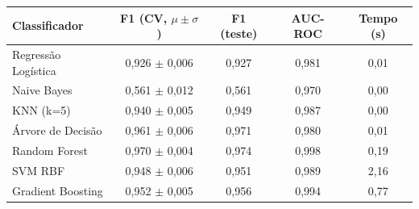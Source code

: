 \begin{tabular}{lcccc}
\hline
\textbf{Classificador} & \textbf{F1 (CV, $\mu\pm\sigma$)} & \textbf{F1 (teste)} & \textbf{AUC-ROC} & \textbf{Tempo (s)} \\
\hline
    Regressão Logística & 0{,}926 $\pm$ 0{,}006 & 0{,}927 & 0{,}981 & 0{,}01 \\
    Naive Bayes & 0{,}561 $\pm$ 0{,}012 & 0{,}561 & 0{,}970 & 0{,}00 \\
    KNN (k=5) & 0{,}940 $\pm$ 0{,}005 & 0{,}949 & 0{,}987 & 0{,}00 \\
    Árvore de Decisão & 0{,}961 $\pm$ 0{,}006 & 0{,}971 & 0{,}980 & 0{,}01 \\
    Random Forest & 0{,}970 $\pm$ 0{,}004 & 0{,}974 & 0{,}998 & 0{,}19 \\
    SVM RBF & 0{,}948 $\pm$ 0{,}006 & 0{,}951 & 0{,}989 & 2{,}16 \\
    Gradient Boosting & 0{,}952 $\pm$ 0{,}005 & 0{,}956 & 0{,}994 & 0{,}77 \\
\hline
\end{tabular}

